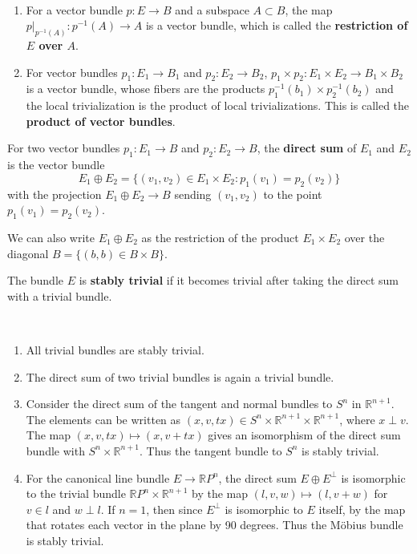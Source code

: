 \begin{defn}
~\begin{enumerate}
\item For a vector bundle $p:E\rightarrow B$ and a subspace $A\subset B$, the map $p|_{p^{-1}(A)}:p^{-1}(A)\rightarrow A$ is a vector bundle, which is called the \textbf{restriction of $E$ over $A$}.
\item For vector bundles $p_1:E_1\rightarrow B_1$ and $p_2:E_2\rightarrow B_2$, $p_1\times p_2:E_1\times E_2\rightarrow B_1\times B_2$ is a vector bundle, whose fibers are the products $p_1^{-1}(b_1)\times p_2^{-1}(b_2)$ and the local trivialization is the product of local trivializations. This is called the \textbf{product of vector bundles}.
\end{enumerate}
\end{defn}

\begin{defn} For two vector bundles $p_1:E_1\rightarrow B$ and $p_2:E_2\rightarrow B$, the \textbf{direct sum} of $E_1$ and $E_2$ is the vector bundle
\begin{equation}
E_1\oplus E_2=\{(v_1,v_2)\in E_1\times E_2:p_1(v_1)=p_2(v_2)\}
\end{equation}
with the projection $E_1\oplus E_2\rightarrow B$ sending $(v_1,v_2)$ to the point $p_1(v_1)=p_2(v_2)$.

We can also write $E_1\oplus E_2$ as the restriction of the product $E_1\times E_2$ over the diagonal $B=\{(b,b)\in B\times B\}$.
\end{defn}

\begin{defn} The bundle $E$ is \textbf{stably trivial} if it becomes trivial after taking the direct sum with a trivial bundle.
\end{defn}

\begin{exmp}
~\begin{enumerate}
\item All trivial bundles are stably trivial.
\item The direct sum of two trivial bundles is again a trivial bundle.
\item Consider the direct sum of the tangent and normal bundles to $S^n$ in $\mathbb{R}^{n+1}$. The elements can be written as $(x,v,tx)\in S^n\times \mathbb{R}^{n+1}\times \mathbb{R}^{n+1}$, where $x\perp v$. The map $(x,v,tx)\mapsto (x,v+tx)$ gives an isomorphism of the direct sum bundle with $S^n\times \mathbb{R}^{n+1}$. Thus the tangent bundle to $S^n$ is stably trivial.
\item For the canonical line bundle $E\rightarrow \mathbb{R}P^n$, the direct sum $E\oplus E^\perp$ is isomorphic to the trivial bundle $\mathbb{R}P^n\times \mathbb{R}^{n+1}$ by the map $(l,v,w)\mapsto (l,v+w)$ for $v\in l$ and $w\perp l$. If $n=1$, then since $E^\perp$ is isomorphic to $E$ itself, by the map that rotates each vector in the plane by 90 degrees. Thus the M{\"o}bius bundle is stably trivial.
\end{enumerate}
\end{exmp}

